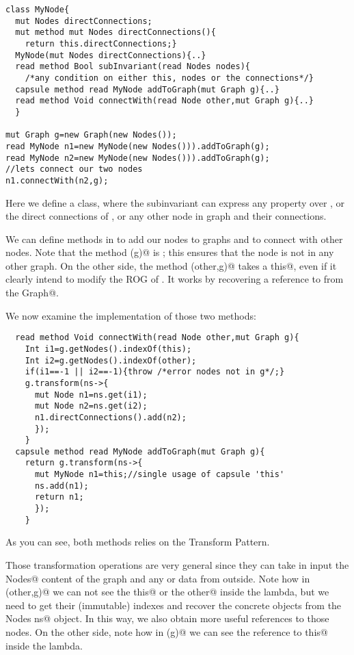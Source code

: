 \begin{lstlisting}
class MyNode{
  mut Nodes directConnections;
  mut method mut Nodes directConnections(){
    return this.directConnections;}
  MyNode(mut Nodes directConnections){..}
  read method Bool subInvariant(read Nodes nodes){
    /*any condition on either this, nodes or the connections*/}  
  capsule method read MyNode addToGraph(mut Graph g){..}
  read method Void connectWith(read Node other,mut Graph g){..}
  }

mut Graph g=new Graph(new Nodes());
read MyNode n1=new MyNode(new Nodes())).addToGraph(g);
read MyNode n2=new MyNode(new Nodes())).addToGraph(g);
//lets connect our two nodes
n1.connectWith(n2,g);
\end{lstlisting}
Here we define a \Q@MyNode@ class, where the subinvariant can express any property over \Q@this@, or the direct connections of \Q@this@, or any other node in graph and their connections.

We can define methods in \Q@MyNode@ to add our nodes
to graphs and to connect with other nodes.
Note that the method \Q@addToGraph(g)@ is \Q@capsule@; this ensures that the node is not in any other graph.
On the other side, the method \Q@connectWith(other,g)@ takes a \Q@read this@, even if it clearly intend to modify the ROG of \Q@this@.
It works by recovering a \Q@mut@ reference to \Q@this@ from the \Q@mut Graph@.

We now examine the implementation of those two methods:
\begin{lstlisting}
  read method Void connectWith(read Node other,mut Graph g){
    Int i1=g.getNodes().indexOf(this);
    Int i2=g.getNodes().indexOf(other);
    if(i1==-1 || i2==-1){throw /*error nodes not in g*/;}
    g.transform(ns->{
      mut Node n1=ns.get(i1);
      mut Node n2=ns.get(i2);
      n1.directConnections().add(n2);
      });
    }
  capsule method read MyNode addToGraph(mut Graph g){
    return g.transform(ns->{
      mut MyNode n1=this;//single usage of capsule 'this'
      ns.add(n1);
      return n1;
      });
    }
\end{lstlisting}
As you can see, both methods relies on the Transform Pattern.

Those transformation operations are very general since they
can take in input the \Q@mut Nodes@ content of the graph and 
any \Q@capsule@ or \Q@imm@ data from outside.
Note how in \Q@connectWith(other,g)@ we can not see the \Q@read this@ or the \Q@read other@
inside the lambda, but we need to get their (immutable) indexes 
and recover the concrete objects from the \Q@mut Nodes ns@ object.
In this way, we also obtain more useful \Q@mut@ references to those nodes.
On the other side, note how in \Q@addToGraph(g)@ we can see the reference to \Q@capsule this@ inside the lambda.

